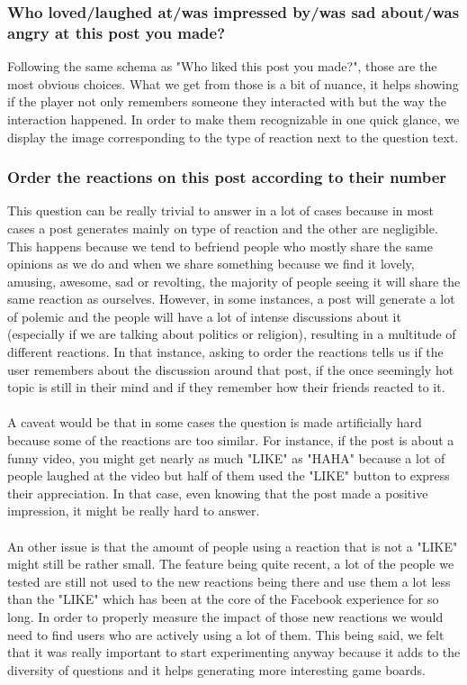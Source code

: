 \subsubsection{Who loved/laughed at/was impressed by/was sad about/was angry at this post you made?}
Following the same schema as "Who liked this post you made?", those are the most obvious choices. What we get from those is a bit of nuance, it helps showing if the player not only remembers someone they interacted with but the way the interaction happened. In order to make them  recognizable in one quick glance, we display the image corresponding to the type of reaction next to the question text. 
\subsubsection{Order the reactions on this post according to their number}
This question can be really trivial to answer in a lot of cases because in most cases a post generates mainly on type of reaction and the other are negligible. This happens because we tend to befriend people who mostly share the same opinions as we do and when we share something because we find it lovely, amusing, awesome, sad or revolting, the majority of people seeing it will share the same reaction as ourselves. However, in some instances, a post will generate a lot of polemic and the people will have a lot of intense discussions about it (especially if we are talking about politics or religion), resulting in a multitude of different reactions. In that instance, asking to order the reactions tells us if the user remembers about the discussion around that post, if the once seemingly hot topic is still in their mind and if they remember how their friends reacted to it.\\\\
A caveat would be that in some cases the question is made artificially hard because some of the reactions are too similar. For instance, if the post is about a funny video, you might get nearly as much "LIKE" as "HAHA" because a lot of people laughed at the video but half of them used the "LIKE" button to express their appreciation. In that case, even knowing that the post made a positive impression, it might be really hard to answer.\\\\
An other issue is that the amount of people using a reaction that is not a "LIKE" might still be rather small. The feature being quite recent, a lot of the people we tested are still not used to the new reactions being there and use them a lot less than the "LIKE" which has been at the core of the Facebook experience for so long. In order to properly measure the impact of those new reactions we would need to find users who are actively using a lot of them. This being said, we felt that it was really important to start experimenting anyway because it adds to the diversity of questions and it helps generating more interesting game boards.\\
